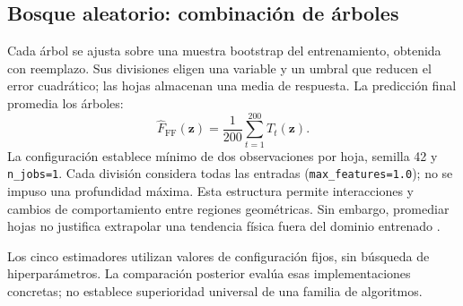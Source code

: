 \subsection{Bosque aleatorio: combinación de árboles}
Cada árbol se ajusta sobre una muestra bootstrap del entrenamiento, obtenida con reemplazo. Sus divisiones eligen una variable y un umbral que reducen el error cuadrático; las hojas almacenan una media de respuesta. La predicción final promedia los árboles:
\begin{equation}
\widehat F_{\mathrm{FF}}(\mathbf z)=\frac{1}{200}\sum_{t=1}^{200}T_t(\mathbf z).
\end{equation}
La configuración establece mínimo de dos observaciones por hoja, semilla 42 y \texttt{n\_jobs=1}. Cada división considera todas las entradas (\texttt{max\_features=1.0}); no se impuso una profundidad máxima. Esta estructura permite interacciones y cambios de comportamiento entre regiones geométricas. Sin embargo, promediar hojas no justifica extrapolar una tendencia física fuera del dominio entrenado \cite{sklearnforest}.

Los cinco estimadores utilizan valores de configuración fijos, sin búsqueda de hiperparámetros. La comparación posterior evalúa esas implementaciones concretas; no establece superioridad universal de una familia de algoritmos.
